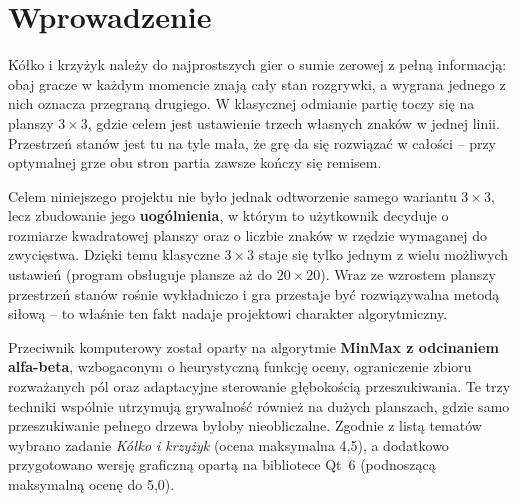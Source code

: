 

\usepackage{listings}
\usepackage{xcolor}


\setlength{\parindent}{0pt}
\setlength{\parskip}{6pt plus 2pt minus 1pt}


\pagestyle{empty}
\hypersetup{hidelinks}
\tableofcontents
\newpage
\pagestyle{plain}


\section{Wprowadzenie}

Kółko i krzyżyk należy do najprostszych gier o sumie zerowej z pełną informacją: obaj gracze
w każdym momencie znają cały stan rozgrywki, a wygrana jednego z nich oznacza przegraną
drugiego. W klasycznej odmianie partię toczy się na planszy $3\times3$, gdzie celem jest
ustawienie trzech własnych znaków w jednej linii. Przestrzeń stanów jest tu na tyle mała,
że grę da się rozwiązać w całości -- przy optymalnej grze obu stron partia zawsze kończy się
remisem.

Celem niniejszego projektu nie było jednak odtworzenie samego wariantu $3\times3$, lecz
zbudowanie jego \textbf{uogólnienia}, w którym to użytkownik decyduje o rozmiarze kwadratowej
planszy oraz o liczbie znaków w rzędzie wymaganej do zwycięstwa. Dzięki temu klasyczne
$3\times3$ staje się tylko jednym z wielu możliwych ustawień (program obsługuje plansze aż do
$20\times20$). Wraz ze wzrostem planszy przestrzeń stanów rośnie wykładniczo i gra przestaje
być rozwiązywalna metodą siłową -- to właśnie ten fakt nadaje projektowi charakter
algorytmiczny.

Przeciwnik komputerowy został oparty na algorytmie \textbf{MinMax z odcinaniem alfa-beta},
wzbogaconym o heurystyczną funkcję oceny, ograniczenie zbioru rozważanych pól oraz adaptacyjne
sterowanie głębokością przeszukiwania. Te trzy techniki wspólnie utrzymują grywalność również
na dużych planszach, gdzie samo przeszukiwanie pełnego drzewa byłoby nieobliczalne. Zgodnie
z listą tematów wybrano zadanie \emph{Kółko i krzyżyk} (ocena maksymalna 4,5), a dodatkowo
przygotowano wersję graficzną opartą na bibliotece Qt~6 (podnoszącą maksymalną ocenę do 5,0).

